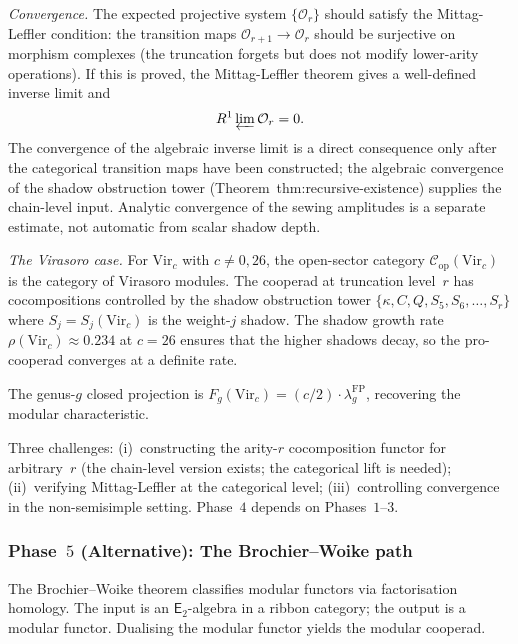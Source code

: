 \documentclass[11pt]{article}
\newcommand{\cC}{\mathcal{C}}
\newcommand{\cO}{\mathcal{O}}
\newcommand{\Etwo}{\mathsf{E}_2}
\begin{document}
\noindent\emph{Convergence.}
The expected projective system $\{\cO_r\}$ should satisfy the Mittag-Leffler
condition: the transition maps $\cO_{r+1} \to \cO_r$ should be
surjective on morphism complexes (the truncation forgets
but does not modify lower-arity operations).  If this is proved,
the Mittag-Leffler theorem gives a well-defined inverse limit and
\[
  R^1 \varprojlim \cO_r = 0.
\]
The convergence of the algebraic inverse limit is a direct
consequence only after the categorical transition maps have been
constructed; the algebraic convergence of the shadow obstruction
tower (Theorem~\textup{thm:recursive-existence}) supplies the
chain-level input.  Analytic convergence of the sewing amplitudes
is a separate estimate, not automatic from scalar shadow depth.

\noindent\emph{The Virasoro case.}
For $\mathrm{Vir}_c$ with $c \neq 0, 26$, the open-sector
category $\cC_{\mathrm{op}}(\mathrm{Vir}_c)$ is the category
of Virasoro modules.  The cooperad at truncation level~$r$ has
cocompositions controlled by the shadow obstruction tower
$\{\kappa, C, Q, S_5, S_6, \ldots, S_r\}$ where
$S_j = S_j(\mathrm{Vir}_c)$ is the weight-$j$ shadow.  The
shadow growth rate $\rho(\mathrm{Vir}_c) \approx 0.234$ at
$c = 26$ ensures that the higher shadows decay, so the
pro-cooperad converges at a definite rate.

The genus-$g$ closed projection is
$F_g(\mathrm{Vir}_c) = (c/2) \cdot \lambda_g^{\mathrm{FP}}$,
recovering the modular characteristic.

Three challenges: (i)~constructing the arity-$r$
cocomposition functor for arbitrary~$r$ (the chain-level
version exists; the categorical lift is needed);
(ii)~verifying Mittag-Leffler at the categorical level;
(iii)~controlling convergence in the non-semisimple setting.
Phase~$4$ depends on Phases~$1$--$3$.

\subsubsection*{Phase~$5$ (Alternative): The Brochier--Woike path}
\label{par:ct2-phase5}

The Brochier--Woike theorem \cite{BrochierWoike2022} classifies
modular functors via factorisation homology.  The input is an
$\Etwo$-algebra in a ribbon category; the output is a modular
functor.  Dualising the modular functor yields the modular
cooperad.
\end{document}
